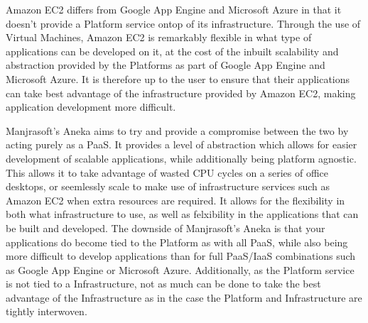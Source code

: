 Amazon EC2 differs from Google App Engine and Microsoft Azure in that it doesn't provide a Platform service ontop of its infrastructure. Through the use of Virtual Machines, Amazon EC2 is remarkably flexible in what type of applications can be developed on it, at the cost of the inbuilt scalability and abstraction provided by the Platforms as part of Google App Engine and Microsoft Azure. It is therefore up to the user to ensure that their applications can take best advantage of the infrastructure provided by Amazon EC2, making application development more difficult.

Manjrasoft's Aneka aims to try and provide a compromise between the two by acting purely as a PaaS. It provides a level of abstraction which allows for easier development of scalable applications, while additionally being platform agnostic. This allows it to take advantage of wasted CPU cycles on a series of office desktops, or seemlessly scale to make use of infrastructure services such as Amazon EC2 when extra resources are required. It allows for the flexibility in both what infrastructure to use, as well as felxibility in the applications that can be built and developed. The downside of Manjrasoft's Aneka is that your applications do become tied to the Platform as with all PaaS, while also being more difficult to develop applications than for full PaaS/IaaS combinations such as Google App Engine or Microsoft Azure. Additionally, as the Platform service is not tied to a Infrastructure, not as much can be done to take the best advantage of the Infrastructure as in the case the Platform and Infrastructure are tightly interwoven. 
